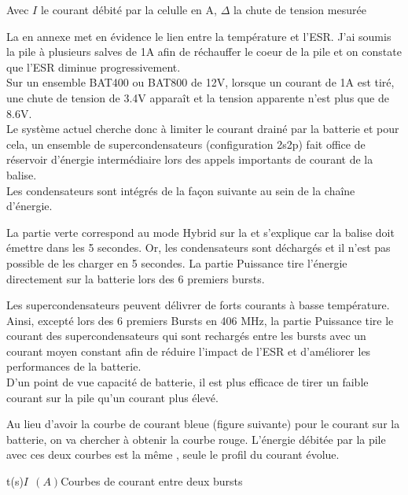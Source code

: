 Avec $I$ le courant débité par la celulle en A, $\Delta $ la chute de tension mesurée


La  en annexe met en évidence le lien entre la température et l'ESR. J'ai soumis la pile à plusieurs salves de 1A afin de réchauffer le coeur de la pile et on constate que l'ESR diminue progressivement.\\

Sur un ensemble BAT400 ou BAT800 de 12V, lorsque un courant de 1A est tiré, une chute de tension de 3.4V apparaît et la tension apparente n'est plus que de 8.6V.\\


Le système actuel cherche donc à limiter le courant drainé par la batterie et pour cela, un ensemble de supercondensateurs (configuration 2s2p) fait office de réservoir d'énergie intermédiaire lors des appels importants de courant de la balise.\\

Les condensateurs sont intégrés de la façon suivante au sein de la chaîne d'énergie.



La partie verte correspond au mode Hybrid sur la  et s'explique car la balise doit émettre dans les 5 secondes. Or, les condensateurs sont déchargés et il n'est pas possible de les charger en 5 secondes. La partie Puissance tire l'énergie directement sur la batterie lors des 6 premiers bursts.


Les supercondensateurs peuvent délivrer de forts courants à basse température. Ainsi, excepté lors des 6 premiers Bursts en 406 MHz, la partie Puissance tire le courant des supercondensateurs qui sont rechargés entre les bursts avec un courant moyen constant afin de réduire l'impact de l'ESR et d'améliorer les performances de la batterie.\\


D'un point de vue capacité de batterie, il est plus efficace de tirer un faible courant sur la pile qu'un courant plus élevé. 

Au lieu d'avoir la courbe de courant bleue (figure suivante) pour le courant sur la batterie, on va chercher à obtenir la courbe rouge. L'énergie débitée par la pile avec ces deux courbes est la même , seule le profil du courant évolue.


\begin{graphic}{0.8}{0.5}{0}{32}{-0.1}{1.6}{t(s)}{$I ~~(A)$}{Courbes de courant entre deux bursts}
\end{graphic}





